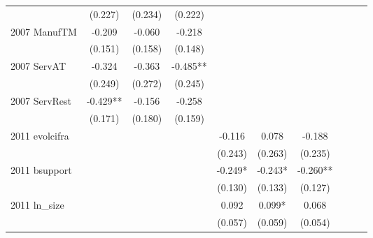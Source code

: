 \begin{table}[htbp]
\begin{tabular}{l*{9}{c}}
                    &     (0.227)   &     (0.234)   &     (0.222)   &               &               &               &               &               &               \\
2007 ManufTM        &      -0.209   &      -0.060   &      -0.218   &               &               &               &               &               &               \\
                    &     (0.151)   &     (0.158)   &     (0.148)   &               &               &               &               &               &               \\
2007 ServAT         &      -0.324   &      -0.363   &      -0.485** &               &               &               &               &               &               \\
                    &     (0.249)   &     (0.272)   &     (0.245)   &               &               &               &               &               &               \\
2007 ServRest       &      -0.429** &      -0.156   &      -0.258   &               &               &               &               &               &               \\
                    &     (0.171)   &     (0.180)   &     (0.159)   &               &               &               &               &               &               \\
2011 evolcifra      &               &               &               &      -0.116   &       0.078   &      -0.188   &               &               &               \\
                    &               &               &               &     (0.243)   &     (0.263)   &     (0.235)   &               &               &               \\
2011 bsupport       &               &               &               &      -0.249*  &      -0.243*  &      -0.260** &               &               &               \\
                    &               &               &               &     (0.130)   &     (0.133)   &     (0.127)   &               &               &               \\
2011 ln\_size        &               &               &               &       0.092   &       0.099*  &       0.068   &               &               &               \\
                    &               &               &               &     (0.057)   &     (0.059)   &     (0.054)   &               &               &               \\

\end{tabular}
\end{table}
